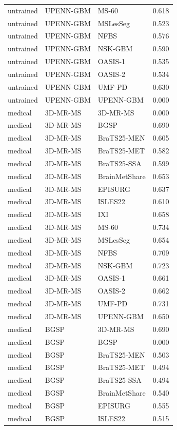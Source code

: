 \begin{tabular}{lllr}
untrained & UPENN-GBM & MS-60 & 0.618 \\
untrained & UPENN-GBM & MSLesSeg & 0.523 \\
untrained & UPENN-GBM & NFBS & 0.576 \\
untrained & UPENN-GBM & NSK-GBM & 0.590 \\
untrained & UPENN-GBM & OASIS-1 & 0.535 \\
untrained & UPENN-GBM & OASIS-2 & 0.534 \\
untrained & UPENN-GBM & UMF-PD & 0.630 \\
untrained & UPENN-GBM & UPENN-GBM & 0.000 \\
medical & 3D-MR-MS & 3D-MR-MS & 0.000 \\
medical & 3D-MR-MS & BGSP & 0.690 \\
medical & 3D-MR-MS & BraTS25-MEN & 0.605 \\
medical & 3D-MR-MS & BraTS25-MET & 0.582 \\
medical & 3D-MR-MS & BraTS25-SSA & 0.599 \\
medical & 3D-MR-MS & BrainMetShare & 0.653 \\
medical & 3D-MR-MS & EPISURG & 0.637 \\
medical & 3D-MR-MS & ISLES22 & 0.610 \\
medical & 3D-MR-MS & IXI & 0.658 \\
medical & 3D-MR-MS & MS-60 & 0.734 \\
medical & 3D-MR-MS & MSLesSeg & 0.654 \\
medical & 3D-MR-MS & NFBS & 0.709 \\
medical & 3D-MR-MS & NSK-GBM & 0.723 \\
medical & 3D-MR-MS & OASIS-1 & 0.661 \\
medical & 3D-MR-MS & OASIS-2 & 0.662 \\
medical & 3D-MR-MS & UMF-PD & 0.731 \\
medical & 3D-MR-MS & UPENN-GBM & 0.650 \\
medical & BGSP & 3D-MR-MS & 0.690 \\
medical & BGSP & BGSP & 0.000 \\
medical & BGSP & BraTS25-MEN & 0.503 \\
medical & BGSP & BraTS25-MET & 0.494 \\
medical & BGSP & BraTS25-SSA & 0.494 \\
medical & BGSP & BrainMetShare & 0.540 \\
medical & BGSP & EPISURG & 0.555 \\
medical & BGSP & ISLES22 & 0.515 \\

\end{tabular}
